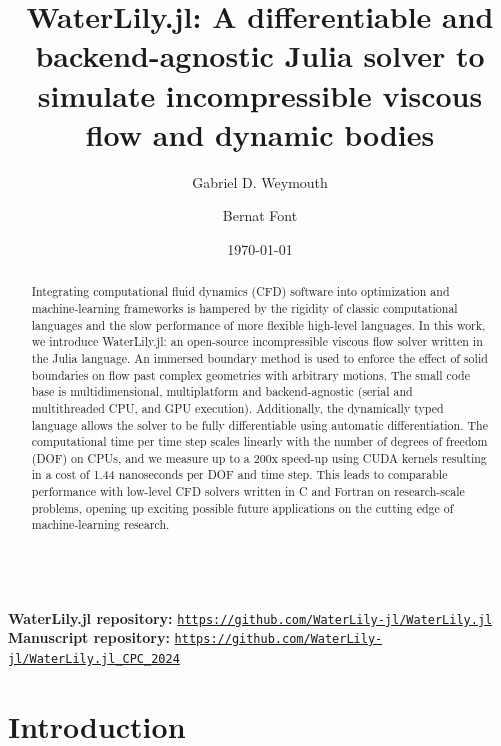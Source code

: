 \documentclass[10pt,a4paper]{article}
\title{\textbf{WaterLily.jl: A differentiable and backend-agnostic Julia solver to simulate incompressible viscous flow and dynamic bodies}}
\author[1]{Gabriel D. Weymouth}
\author[1,2,\footnote{\href{mailto:b.font@tudelft.nl}{\texttt{b.font@tudelft.nl}}}]{Bernat Font}
\affil[1]{Faculty of Mechanical Engineering, Delft University of Technology, Delft, Netherlands}
\affil[2]{Barcelona Supercomputing Center, Barcelona, Spain}
\date{\today}
\begin{document}
{\let\newpage\relax\maketitle}

\date{\vspace{-20pt}}
\begin{abstract}
Integrating computational fluid dynamics (CFD) software into optimization and machine-learning frameworks is hampered by the rigidity of classic computational languages and the slow performance of more flexible high-level languages. In this work, we introduce WaterLily.jl: an open-source incompressible viscous flow solver written in the Julia language. An immersed boundary method is used to enforce the effect of solid boundaries on flow past complex geometries with arbitrary motions. The small code base is multidimensional, multiplatform and backend-agnostic (serial and multithreaded CPU, and GPU execution). Additionally, the dynamically typed language allows the solver to be fully differentiable using automatic differentiation. The computational time per time step scales linearly with the number of degrees of freedom (DOF) on CPUs, and we measure up to a 200x speed-up using CUDA kernels resulting in a cost of 1.44 nanoseconds per DOF and time step. This leads to comparable performance with low-level CFD solvers written in C and Fortran on research-scale problems, opening up exciting possible future applications on the cutting edge of machine-learning research.
\end{abstract}

\begin{small}
  \noindent
  \\
  \textbf{WaterLily.jl repository:} \href{https://github.com/WaterLily-jl/WaterLily.jl}{\texttt{https://github.com/WaterLily-jl/WaterLily.jl}}\\
  \textbf{Manuscript repository:} \href{https://github.com/WaterLily-jl/WaterLily.jl_CPC_2024}{\texttt{https://github.com/WaterLily-jl/WaterLily.jl\_CPC\_2024}}
\end{small}

\section{Introduction}
\end{document}

